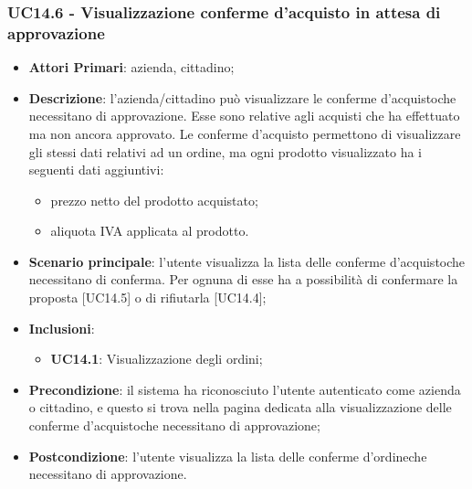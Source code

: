 \subsubsection{UC14.6 - Visualizzazione conferme d'acquisto in attesa di 
approvazione}
\begin{itemize}
	\item \textbf{Attori Primari}: azienda, cittadino;
	\item \textbf{Descrizione}: l'azienda/cittadino può visualizzare le conferme d'acquisto\glosp che necessitano di approvazione. Esse sono relative agli acquisti che ha effettuato ma non ancora approvato. Le conferme d'acquisto permettono di visualizzare gli stessi dati relativi ad un ordine, ma ogni prodotto visualizzato ha i seguenti dati aggiuntivi:
	\begin{itemize}
		\item prezzo netto del prodotto acquistato;	
		\item aliquota IVA applicata al prodotto.
	\end{itemize}
	\item \textbf{Scenario principale}: l'utente visualizza la lista delle 
	conferme d'acquisto\glosp che necessitano di conferma. Per ognuna di esse 
	ha a possibilità di confermare la proposta [UC14.5] o di rifiutarla 
	[UC14.4];
	\item \textbf{Inclusioni}:
	\begin{itemize}
		\item \textbf{UC14.1}: Visualizzazione degli ordini;
	\end{itemize}
	\item \textbf{Precondizione}: il sistema ha riconosciuto l'utente autenticato come azienda o cittadino, e questo si trova nella pagina dedicata alla visualizzazione delle conferme d'acquisto\glosp che necessitano di approvazione;
	\item \textbf{Postcondizione}: l'utente visualizza la lista delle conferme d'ordine\glosp che necessitano di approvazione.
\end{itemize}






